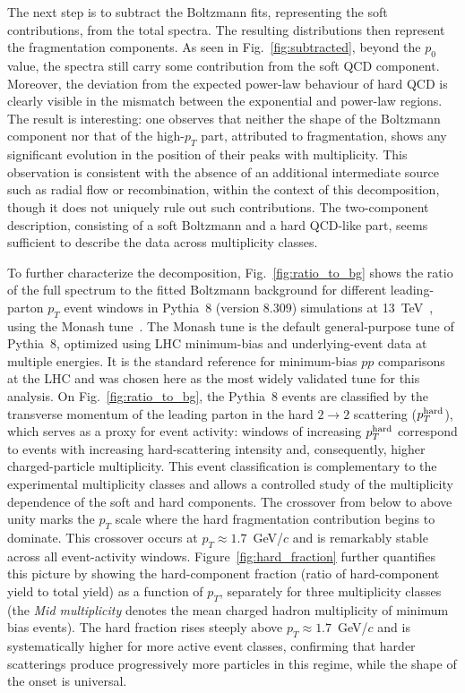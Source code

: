 \documentclass[pdflatex,sn-mathphys-num]{sn-jnl}%
\begin{document}
The next step is to subtract the Boltzmann fits, representing the soft contributions, from the total spectra. The resulting distributions then represent the fragmentation components. As seen in Fig.~\ref{fig:subtracted}, beyond the $p_0$ value, the spectra still carry some contribution from the soft QCD component. Moreover, the deviation from the expected power-law behaviour of hard QCD is clearly visible in the mismatch between the exponential and power-law regions. The result is interesting: one observes that neither the shape of the Boltzmann component nor that of the high-$p_T$ part, attributed to fragmentation, shows any significant evolution in the position of their peaks with multiplicity. This observation is consistent with the absence of an additional intermediate source such as radial flow or recombination, within the context of this decomposition, though it does not uniquely rule out such contributions. The two-component description, consisting of a soft Boltzmann and a hard QCD-like part, seems sufficient to describe the data across multiplicity classes.

To further characterize the decomposition, Fig.~\ref{fig:ratio_to_bg} shows the ratio of the full spectrum to the fitted Boltzmann background for different leading-parton $p_T$ event windows in {\sc Pythia}~8 (version 8.309) simulations at 13~TeV~\cite{Sjostrand:2014zea}, using the Monash tune~\cite{Skands:2014pea}. The Monash tune is the default general-purpose tune of {\sc Pythia}~8, optimized using LHC minimum-bias and underlying-event data at multiple energies. It is the standard reference for minimum-bias $pp$ comparisons at the LHC and was chosen here as the most widely validated tune for this analysis. On Fig.~\ref{fig:ratio_to_bg}, the {\sc Pythia}~8 events are classified by the transverse momentum of the leading parton in the hard $2\to 2$ scattering ($p_T^{\rm hard}$), which serves as a proxy for event activity: windows of increasing $p_T^{\rm hard}$ correspond to events with increasing hard-scattering intensity and, consequently, higher charged-particle multiplicity. This event classification is complementary to the experimental multiplicity classes and allows a controlled study of the multiplicity dependence of the soft and hard components. The crossover from below to above unity marks the $p_T$ scale where the hard fragmentation contribution begins to dominate. This crossover occurs at $p_T \approx 1.7$~GeV/$c$ and is remarkably stable across all event-activity windows. Figure~\ref{fig:hard_fraction} further quantifies this picture by showing the hard-component fraction (ratio of hard-component yield to total yield) as a function of $p_T$, separately for three multiplicity classes (the \textit{Mid multiplicity} denotes the mean charged hadron multiplicity of minimum bias events). The hard fraction rises steeply above $p_T \approx 1.7$~GeV/$c$ and is systematically higher for more active event classes, confirming that harder scatterings produce progressively more particles in this regime, while the shape of the onset is universal.
\end{document}
